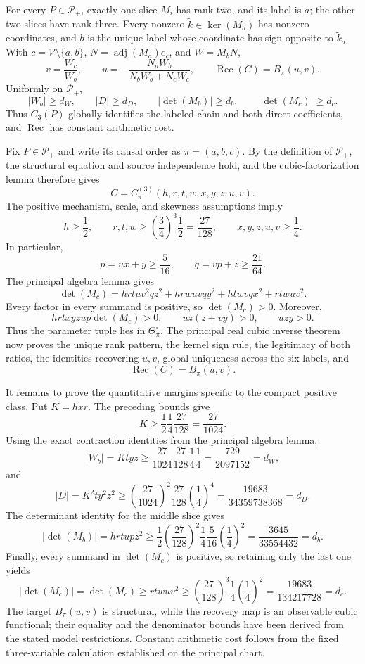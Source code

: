 For every \(P\in\mathcal P_+\), exactly one slice \(M_i\) has rank two, and its label is \(a\); the other two slices have rank three. Every nonzero \(\widetilde k\in\ker(M_a)\) has nonzero coordinates, and \(b\) is the unique label whose coordinate has sign opposite to \(\widetilde k_a\). With \(c=\mathcal V\setminus\{a,b\}\), \(N=\operatorname{adj}(M_a)e_c\), and \(W=M_bN\),
\[
v=\frac{W_c}{W_b},\qquad u=-\frac{N_aW_b}{N_bW_b+N_cW_c},\qquad \operatorname{Rec}(C)=B_\pi(u,v).
\]
Uniformly on \(\mathcal P_+\),
\[
|W_b|\ge d_W,\qquad |D|\ge d_D,\qquad |\det(M_b)|\ge d_b,\qquad |\det(M_c)|\ge d_c.
\]
Thus \(C_3(P)\) globally identifies the labeled chain and both direct coefficients, and \(\operatorname{Rec}\) has constant arithmetic cost.

Fix \(P\in\mathcal P_+\) and write its causal order as \(\pi=(a,b,c)\).  By the definition of \(\mathcal P_+\), the structural equation and source independence hold, and the cubic-factorization lemma therefore gives
\[
C=C_{\pi}^{(3)}(h,r,t,w,x,y,z,u,v).
\]
The positive mechanism, scale, and skewness assumptions imply
\[
h\ge\frac12,
\qquad
r,t,w\ge\left(\frac34\right)^3\frac12=\frac{27}{128},
\qquad
x,y,z,u,v\ge\frac14.
\]
In particular,
\[
p=ux+y\ge\frac{5}{16},
\qquad
q=vp+z\ge\frac{21}{64}.
\]
The principal algebra lemma gives
\[
\det(M_c)=hrtuv^2qz^2+hrwuvqy^2+htwvqx^2+rtwuv^2.
\]
Every factor in every summand is positive, so \(\det(M_c)>0\).  Moreover,
\[
hrtxyzup\det(M_c)>0,
\qquad
uz(z+vy)>0,
\qquad
uzy>0.
\]
Thus the parameter tuple lies in \(\Theta_{\pi}^{\circ}\).  The principal real cubic inverse theorem now proves the unique rank pattern, the kernel sign rule, the legitimacy of both ratios, the identities recovering \(u,v\), global uniqueness across the six labels, and
\[
\operatorname{Rec}(C)=B_{\pi}(u,v).
\]

It remains to prove the quantitative margins specific to the compact positive class.  Put \(K=hxr\).  The preceding bounds give
\[
K\ge\frac12\frac14\frac{27}{128}=\frac{27}{1024}.
\]
Using the exact contraction identities from the principal algebra lemma,
\[
|W_b|=Ktyz
\ge \frac{27}{1024}\frac{27}{128}\frac14\frac14
=\frac{729}{2097152}=d_W,
\]
and
\[
|D|=K^2ty^2z^2
\ge\left(\frac{27}{1024}\right)^2\frac{27}{128}
\left(\frac14\right)^4
=\frac{19683}{34359738368}=d_D.
\]
The determinant identity for the middle slice gives
\[
|\det(M_b)|=hrtupz^2
\ge\frac12\left(\frac{27}{128}\right)^2
\frac14\frac{5}{16}\left(\frac14\right)^2
=\frac{3645}{33554432}=d_b.
\]
Finally, every summand in \(\det(M_c)\) is positive, so retaining only the last one yields
\[
|\det(M_c)|=\det(M_c)\ge rtwuv^2
\ge\left(\frac{27}{128}\right)^3\frac14
\left(\frac14\right)^2
=\frac{19683}{134217728}=d_c.
\]
The target \(B_{\pi}(u,v)\) is structural, while the recovery map is an observable cubic functional; their equality and the denominator bounds have been derived from the stated model restrictions.  Constant arithmetic cost follows from the fixed three-variable calculation established on the principal chart.

